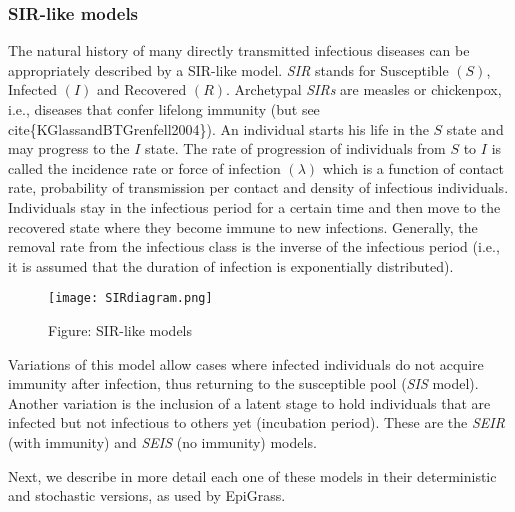 \documentclass[a4paper,10pt,english]{sphinxmanual}
\begin{document}
\subsubsection{SIR-like models}
\label{intromodels:sir-like-models}
The natural history of many directly transmitted infectious diseases can be appropriately described by a SIR-like model. \emph{SIR} stands for Susceptible \((S)\), Infected \((I)\) and Recovered \((R)\). Archetypal \emph{SIRs} are measles or chickenpox, i.e., diseases that confer lifelong immunity (but see cite\{KGlassandBTGrenfell2004\}). An individual starts his life in the \(S\) state and may progress to the \(I\) state. The rate of progression of individuals from \(S\) to \(I\) is called the incidence rate or force of infection \((\lambda)\) which is a function of contact rate, probability of transmission per contact and density of infectious individuals. Individuals stay in the infectious period for a certain time and then move to the recovered state where they become immune to new infections. Generally, the removal rate from the infectious class is the inverse of the infectious period (i.e., it is assumed that the duration of infection is exponentially distributed).
\begin{figure}[htbp]
\centering
\capstart

\texttt{[image: SIRdiagram.png]}
\caption{Figure: SIR-like models}\label{intromodels:fig-sir}\end{figure}

Variations of this model allow cases where infected individuals do not acquire immunity after infection, thus returning to the susceptible pool (\emph{SIS} model). Another variation is the inclusion of a latent stage to hold individuals that are infected but not infectious to others yet (incubation period). These are the \emph{SEIR} (with immunity) and \emph{SEIS} (no immunity) models.

Next, we describe in more detail each one of these models in their deterministic and stochastic versions, as used by EpiGrass.
\end{document}
